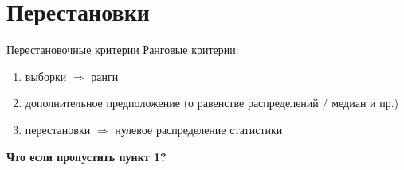 \documentclass[11pt,pdf,utf8,hyperref={unicode},aspectratio=169]{beamer}
\begin{document}
\section{Перестановки}
\begin{frame}{Перестановочные критерии}
	Ранговые критерии:
	\begin{enumerate}
		\item выборки $\Rightarrow$ ранги
        \bigskip
		\item дополнительное предположение (о равенстве распределений / медиан и пр.)
        \bigskip
		\item перестановки  $\Rightarrow$ нулевое распределение статистики
	\end{enumerate}

	\bigskip

	\textbf{Что если пропустить пункт 1?}
\end{frame}
\end{document}
